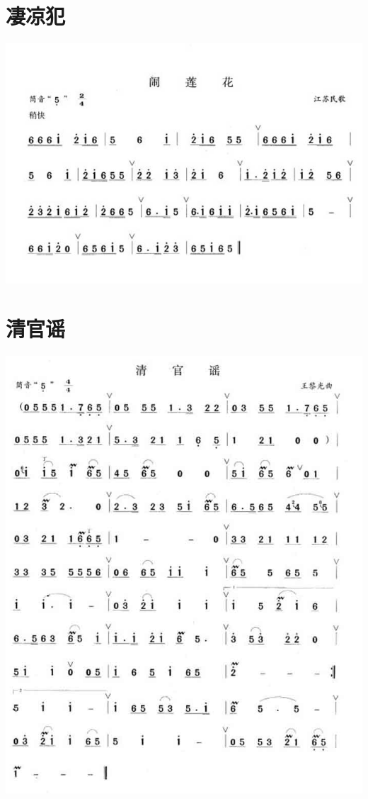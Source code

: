 \documentclass[cn,pad,chinese,chinesefont=nofont]{elegantbook}
\begin{document}
\section{凄凉犯}
    \includegraphics[width=\textwidth]{dongxiao/20200323凄凉犯.jpg}
\section{清官谣}
    \includegraphics[width=\textwidth]{dongxiao/20200323清官谣.jpg}
\end{document}
